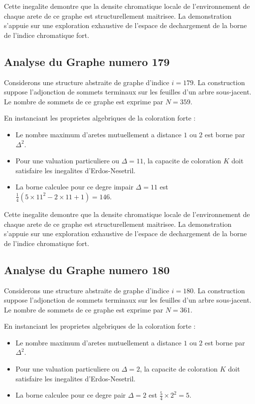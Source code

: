 \documentclass[11pt,a4paper]{article}
\begin{document}
Cette inegalite demontre que la densite chromatique locale de l'environnement de chaque arete de ce graphe est structurellement maitrisee. La demonstration s'appuie sur une exploration exhaustive de l'espace de dechargement de la borne de l'indice chromatique fort.

\subsection{Analyse du Graphe numero 179}
Considerons une structure abstraite de graphe d'indice $i = 179$. La construction suppose l'adjonction de sommets terminaux sur les feuilles d'un arbre sous-jacent. Le nombre de sommets de ce graphe est exprime par $N = 359$.

En instanciant les proprietes algebriques de la coloration forte :
\begin{itemize}
\item Le nombre maximum d'aretes mutuellement a distance $1$ ou $2$ est borne par $\Delta^2$.
\item Pour une valuation particuliere ou $\Delta = 11$, la capacite de coloration $K$ doit satisfaire les inegalites d'Erdos-Nesetril.
\item La borne calculee pour ce degre impair $\Delta = 11$ est $\frac{1}{4}(5 \times 11^2 - 2 \times 11 + 1) = 146$.
\end{itemize}

Cette inegalite demontre que la densite chromatique locale de l'environnement de chaque arete de ce graphe est structurellement maitrisee. La demonstration s'appuie sur une exploration exhaustive de l'espace de dechargement de la borne de l'indice chromatique fort.

\subsection{Analyse du Graphe numero 180}
Considerons une structure abstraite de graphe d'indice $i = 180$. La construction suppose l'adjonction de sommets terminaux sur les feuilles d'un arbre sous-jacent. Le nombre de sommets de ce graphe est exprime par $N = 361$.

En instanciant les proprietes algebriques de la coloration forte :
\begin{itemize}
\item Le nombre maximum d'aretes mutuellement a distance $1$ ou $2$ est borne par $\Delta^2$.
\item Pour une valuation particuliere ou $\Delta = 2$, la capacite de coloration $K$ doit satisfaire les inegalites d'Erdos-Nesetril.
\item La borne calculee pour ce degre pair $\Delta = 2$ est $\frac{5}{4} \times 2^2 = 5$.
\end{itemize}
\end{document}
